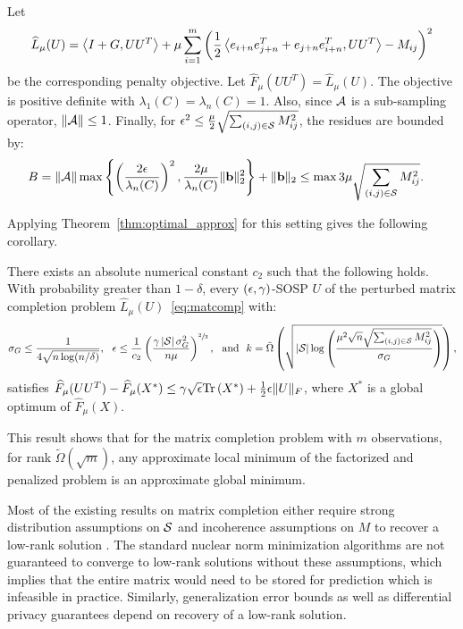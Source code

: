 Let
\begin{align}
	\widehat{L}_{\mu}(U) = \left\langle I+G, UU^T \right\rangle + \mu \sum_{i=1}^m \left(\frac{1}{2}\left\langle e_{i+n}e_{j+n}^T + e_{j+n} e_{i+n}^T, UU^T \right\rangle - M_{ij} \right)^2  \label{eq:matcomp}
\end{align}
be the corresponding penalty objective.  Let $\widehat F_{\mu}(UU^T) = \widehat L_{\mu} (U)$. The objective is positive definite with $\lambda_1(C)=\lambda_n(C)=1$. Also, since $\mathcal{A}$ is a sub-sampling operator, $\|\mathcal{A}\| \leq 1$. Finally, for $\epsilon^2 \leq \frac{\mu}{2}\sqrt{\sum_{(i,j) \in \mathcal{S}} M_{ij}^2}$, the residues are bounded by: \begin{align*} B&=\|\mathcal{A}\| \max \left \{ \left( \frac{2\epsilon} {\lambda_n(C)}\right)^2, \frac{2\mu}{\lambda_n(C)} \|\mathbf{b}\|_2^2 \right \}+\|\mathbf{b}\|_2 \leq \max  3\mu \sqrt{\sum_{(i,j) \in \mathcal{S}} M_{ij}^2}. \end{align*}


\noindent Applying Theorem~\ref{thm:optimal_approx} for this setting gives the following corollary.
\begin{corollary}\label{cor:mc_optimal}There exists an absolute numerical constant $c_2$ such that the following holds. With probability greater than $1-\delta$,
every $(\epsilon, \gamma)$-SOSP $U$ of the perturbed matrix completion problem $\widehat{L}_{\mu}(U)$~\eqref{eq:matcomp} with:
\begin{align*}\sigma_G \leq \frac{1}{4\sqrt{n \log(n/ \delta)}},~~ \epsilon \leq \frac{1}{c_2}\left(\frac{\gamma \left\lvert{\mathcal{S}}\right\rvert \sigma_G^2 }{ n  \mu }\right)^{\sfrac{2}{3}}, ~\text{ and }~ k = \tilde{\Omega} \left( \sqrt{ \left\lvert{\mathcal{S}}\right\rvert   \log\left(\frac{\mu^2 \sqrt{n} \sqrt{\sum_{(i,j) \in \mathcal{S}} M_{ij}^2}}{\sigma_G}\right) } \right),\end{align*} satisfies $\widehat{F}_{\mu}(UU^T)  - \widehat F_{\mu}(X^*)  \leq \gamma \sqrt{\epsilon} \mathrm{Tr}\left(X^*\right) + \frac{1}{2} \epsilon \|U\|_F$, where $X^*$ is a global optimum of $\widehat{F}_{\mu}(X)$.
\end{corollary}
\noindent This result shows that for the  matrix completion problem with $m$ observations, for rank $\tilde{\Omega}(\sqrt{m})$, any approximate local minimum of the factorized and penalized problem is an approximate global minimum. 

Most of the existing results on matrix completion either require strong distribution assumptions on $\mathcal{S}$ and incoherence assumptions on $M$ to recover a low-rank solution \citep{candes2009exact, jain2013low}. The standard nuclear norm minimization algorithms are not guaranteed to converge to low-rank solutions without these assumptions,  which implies that the entire matrix would need to be stored for prediction which is infeasible in practice. Similarly,  generalization error bounds \citep{foygel2011concentration} as well as differential privacy guarantees  depend on recovery of a low-rank solution.

